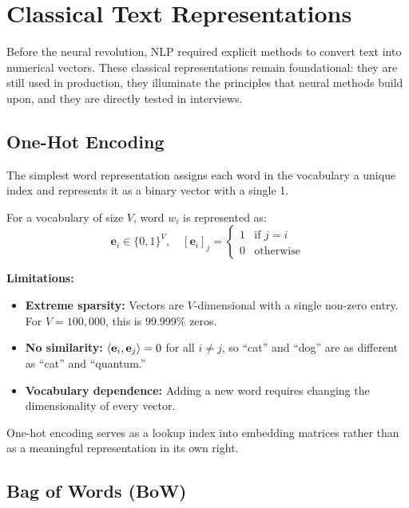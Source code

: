 \section{Classical Text Representations}
\label{sec:representations}

Before the neural revolution, NLP required explicit methods to convert text into numerical
vectors. These classical representations remain foundational: they are still used in
production, they illuminate the principles that neural methods build upon, and they are
directly tested in interviews.

\subsection{One-Hot Encoding}
\label{sec:one_hot}

The simplest word representation assigns each word in the vocabulary a unique index and
represents it as a binary vector with a single 1.

For a vocabulary of size $V$, word $w_i$ is represented as:
\begin{equation}
    \mathbf{e}_i \in \{0, 1\}^V, \quad [\mathbf{e}_i]_j = \begin{cases} 1 & \text{if } j = i \\ 0 & \text{otherwise} \end{cases}
\end{equation}

\textbf{Limitations:}
\begin{itemize}
    \item \textbf{Extreme sparsity:} Vectors are $V$-dimensional with a single non-zero
    entry. For $V = 100{,}000$, this is 99.999\% zeros.
    \item \textbf{No similarity:} $\langle\mathbf{e}_i,\mathbf{e}_j\rangle = 0$ for all $i
    \neq j$, so ``cat'' and ``dog'' are as different as ``cat'' and ``quantum.''
    \item \textbf{Vocabulary dependence:} Adding a new word requires changing the
    dimensionality of every vector.
\end{itemize}

One-hot encoding serves as a lookup index into embedding matrices rather than as a
meaningful representation in its own right.

\subsection{Bag of Words (BoW)}
\label{sec:bow}

